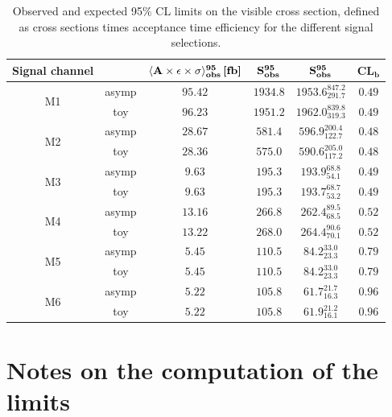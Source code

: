 \begin{table}[tb]
\begin{center}
\begin{tabular}{cccccc}
\hline
{\bf Signal channel} & & $\mathbf{\langle A\times\epsilon\times\sigma\rangle^{95}_\text{\textbf{obs}}\,\text{\textbf{[fb]}}}$ & $\mathbf{S^{95}_\text{\textbf{obs}}}$ & $\mathbf{S^{95}_\text{\textbf{obs}}}$ & $\mathbf{CL_b}$ \\
\hline
\multirow{2}{*}{M1} & asymp & $95.42$ & $1934.8$ & $1953.6^{847.2}_{291.7}$ & $0.49$ \\
                    & toy   & $96.23$ & $1951.2$ & $1962.0^{839.8}_{319.3}$ & $0.49$ \\
\multirow{2}{*}{M2} & asymp & $28.67$ & $581.4$  & $596.9^{200.4}_{122.7} $ & $0.48$ \\
                    & toy   & $28.36$ & $575.0$  & $590.6^{205.0}_{117.2} $ & $0.48$ \\
\multirow{2}{*}{M3} & asymp & $9.63$  & $195.3$  & $193.9^{68.8}_{54.1}$    & $0.49$ \\
                    & toy   & $9.63$  & $195.3$  & $193.7^{68.7}_{53.2}$    & $0.49$ \\
\multirow{2}{*}{M4} & asymp & $13.16$ & $266.8$  & $262.4^{89.5}_{68.5}$    & $0.52$ \\
                    & toy   & $13.22$ & $268.0$  & $264.4^{90.6}_{70.1}$    & $0.52$ \\
\multirow{2}{*}{M5} & asymp & $5.45$  & $110.5$  & $84.2^{33.0}_{23.3}$     & $0.79$ \\
                    & toy   & $5.45$  & $110.5$  & $84.2^{33.0}_{23.3}$     & $0.79$ \\
\multirow{2}{*}{M6} & asymp & $5.22$  & $105.8$  & $61.7^{21.7}_{16.3}$     & $0.96$ \\
                    & toy        & $5.22$  & $105.8$  & $61.9^{21.2}_{16.1}$     & $0.96$ \\
\hline
\end{tabular}
\end{center}
\caption[Model independent 95\% CL limits for the different signal regions.]{Observed and expected 95$\%$ CL limits on the visible cross section, defined as cross sections times acceptance time efficiency for the different signal selections.}
\label{tab:modelIndependent}
\end{table}


\section{Notes on the computation of the limits}
    \label{sec:ComputationOfLimits}

